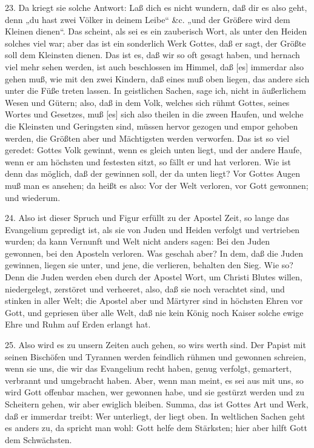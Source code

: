 23. Da kriegt sie solche Antwort: Laß dich es nicht wundern, daß dir es also geht, denn „du hast zwei Völker in deinem Leibe“ \&c. „und der Größere wird dem Kleinen dienen“. Das scheint, als sei es ein zauberisch Wort, als unter den Heiden solches viel war; aber das ist ein sonderlich Werk Gottes, daß er sagt, der Größte soll dem Kleinsten dienen. Das ist es, daß wir so oft gesagt haben, und hernach viel mehr sehen werden, ist auch beschlossen im Himmel, daß [es] immerdar also gehen muß, wie mit den zwei Kindern, daß eines muß oben liegen, das andere sich unter die Füße treten lassen. In geistlichen Sachen, sage ich, nicht in äußerlichem Wesen und Gütern; also, daß in dem Volk, welches sich rühmt Gottes, seines Wortes und Gesetzes, muß [es] sich also theilen in die zween Haufen, und welche die Kleinsten und Geringsten sind, müssen hervor gezogen und empor gehoben werden, die Größten aber und Mächtigsten werden verworfen. Das ist so viel geredet: Gottes Volk gewinnt, wenn es gleich unten liegt, und der andere Haufe, wenn er am höchsten und festesten sitzt, so fällt er und hat verloren. Wie ist denn das möglich, daß der gewinnen soll, der da unten liegt? Vor Gottes Augen muß man es ansehen; da heißt es also: Vor der Welt verloren, vor Gott gewonnen; und wiederum.

24. Also ist dieser Spruch und Figur erfüllt zu der Apostel Zeit, so lange das Evangelium gepredigt ist, als sie von Juden und Heiden verfolgt und vertrieben wurden; da kann Vernunft und Welt nicht anders sagen: Bei den Juden gewonnen, bei den Aposteln verloren. Was geschah aber? In dem, daß die Juden gewinnen, liegen sie unter, und jene, die verlieren, behalten den Sieg. Wie so? Denn die Juden werden eben durch der Apostel Wort, um Christi Blutes willen, niedergelegt, zerstöret und verheeret, also, daß sie noch verachtet sind, und stinken in aller Welt; die Apostel aber und Märtyrer sind in höchsten Ehren vor Gott, und gepriesen über alle Welt, daß nie kein König noch Kaiser solche ewige Ehre und Ruhm auf Erden erlangt hat.

25. Also wird es zu unsern Zeiten auch gehen, so wirs werth sind. Der Papist mit seinen Bischöfen und Tyrannen werden feindlich rühmen und gewonnen schreien, wenn sie uns, die wir das Evangelium recht haben, genug verfolgt, gemartert, verbrannt und umgebracht haben. Aber, wenn man meint, es sei aus mit uns, so wird Gott offenbar machen, wer gewonnen habe, und sie gestürzt werden und zu Scheitern gehen, wir aber ewiglich bleiben. Summa, das ist Gottes Art und Werk, daß er immerdar treibt: Wer unterliegt, der liegt oben. In weltlichen Sachen geht es anders zu, da spricht man wohl: Gott helfe dem Stärksten; hier aber hilft Gott dem Schwächsten.

